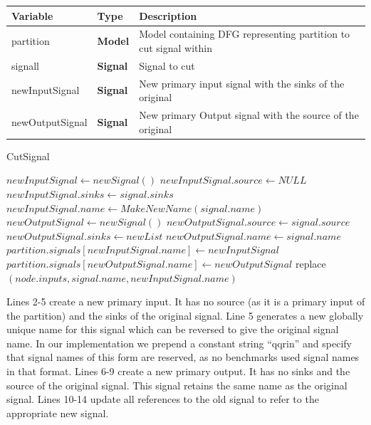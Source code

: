 \documentclass[12pt,final,oneside]{dwThesis} %
\begin{document}
   \begin{algorithm}

      \begin{center}

         \begin{tabularx}
            {\linewidth}{llX} \toprule
            Variable & Type & Description\\
            \midrule
            partition & \textbf{Model} & Model containing DFG representing partition to cut signal within \\
            signall & \textbf{Signal} & Signal to cut \\
            newInputSignal & \textbf{Signal} & New primary input signal with the sinks of the original\\
            newOutputSignal & \textbf{Signal} & New primary Output signal with the source of the original\\
            \bottomrule 
         \end{tabularx}


      \end{center}
      \caption{CutSignal}\label{cutsignal}

      \begin{algorithmic}[1]
      		\State $newInputSignal \gets new Signal()$
      		\State $newInputSignal.source \gets NULL$
      		\State $newInputSignal.sinks \gets signal.sinks$
      		\State $newInputSignal.name \gets MakeNewName(signal.name)$ 
      		\State $newOutputSignal \gets new Signal()$
      		\State $newOutputSignal.source \gets signal.source$
      		\State $newOutputSignal.sinks \gets new List$ 
      		\State $newOutputSignal.name \gets signal.name$
      		\State $partition.signals[newInputSignal.name] \gets newInputSignal$
      		\State $partition.signals[newOutputSignal.name] \gets newOutputSignal$
      		\State
      			\State replace$(node.inputs, signal.name, newInputSignal.name)$ 
		\EndFor
\EndProcedure
      \end{algorithmic}
      \end{algorithm}
      Lines 2-5 create a new primary input. It has no source (as it is a primary input of the partition) and the sinks of the original signal.
      Line 5 generates a new globally unique name for this signal which can be reversed to give the original signal name. In our implementation we prepend a constant string ``qqrin'' and specify that signal names of this form are reserved, as no benchmarks used signal names in that format.
      Lines 6-9 create a new primary output. It has no sinks and the source of the original signal. This signal retains the same name as the original signal.
      Lines 10-14 update all references to the old signal to refer to the appropriate new signal.
\end{document}
